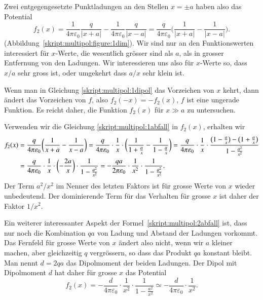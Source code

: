 Zwei entgegengesetzte Punktladungen an den Stellen $x=\pm a$ haben also
das Potential
\begin{equation}
f_2(x)
=
\frac1{4\pi\varepsilon_0}\frac{q}{|x+a|}
-
\frac1{4\pi\varepsilon_0}\frac{q}{|x-a|}
=
\frac{q}{4\pi\varepsilon_0}\biggl( \frac1{|x+a|} - \frac1{|x-a|} \biggr).
\label{skript:multipol:1dipol}
\end{equation}
(Abbildung~\ref{skript:multipol:figure:1dim}).
Wir sind nur an den Funktionswerten interessiert für $x$-Werte, die
wesentlich grösser sind als $a$, als in grosser Entfernung von
den Ladungen.
Wir interessieren uns also für $x$-Werte so, dass $x/a$ sehr gross ist,
oder umgekehrt dass $a/x$ sehr klein ist.

Wenn man in Gleichung \eqref{skript:multipol:1dipol} das Vorzeichen
von $x$ kehrt, dann ändert das Vorzeichen von $f$, also $f_2(-x)=-f_2(x)$,
$f$ ist eine ungerade Funktion.
Es reicht daher, die Funktion $f_2(x)$ für $x\gg a$ zu untersuchen.

Verwenden wir die Gleichung \eqref{skript:multipol:1abfall} in $f_2(x)$,
erhalten wir
\begin{align}
f_2(x)
&=
\frac{q}{4\pi\varepsilon_0}\biggl(\frac1{x+a}-\frac1{x-a}\biggr)
=
\frac{q}{4\pi\varepsilon_0}\cdot\frac1x\cdot\biggl(
\frac1{1+\frac{a}{x}}
-
\frac1{1-\frac{a}{x}}
\biggr)
=
\frac{q}{4\pi\varepsilon_0}\cdot\frac1x\cdot
\frac{\bigl(1-\frac{a}{x}\bigr)-\bigl(1+\frac{a}{x}\bigr)}{1-\frac{a^2}{x^2}}
\notag
\\
&=
\frac{q}{4\pi\varepsilon_0}\cdot\frac1x\cdot
\biggl(-\frac{2a}{x}\biggr)
\cdot
\frac1{1-\frac{a^2}{x^2}}
=
-\frac{qa}{2\pi\varepsilon_0}\cdot\frac1{x^2}\cdot\frac{1}{1-\frac{a^2}{x^2}}.
\label{skript:multipol:2abfall}
\end{align}
Der Term $a^2/x^2$ im Nenner des letzten Faktors ist für grosse Werte von
$x$ wieder unbedeutend.
Der dominierende Term für das Verhalten für grosse $x$ ist daher der
Faktor $1/x^2$.

Ein weiterer interessanter Aspekt der Formel~\eqref{skript:multipol:2abfall}
ist, dass nur noch die Kombination $qa$ von Ladung und Abstand der Ladungen
vorkommt.
Das Fernfeld für grosse Werte von $x$ ändert also nicht, wenn wir $a$
kleiner machen, aber gleichzeitig $q$ vergrössern, so dass das Produkt
$qa$ konstant bleibt.
Man nennt $d=2qa$ das Dipolmoment der beiden Ladungen.
Der Dipol mit Dipolmoment $d$ hat daher für grosse $x$ das Potential
\[
f_2(x)
=
-\frac{d}{4\pi\varepsilon_0}\cdot \frac1{x^2}\cdot \frac1{1-\frac{a^2}{x^2}}
\simeq
-\frac{d}{4\pi\varepsilon_0}\cdot \frac1{x^2}.
\]

